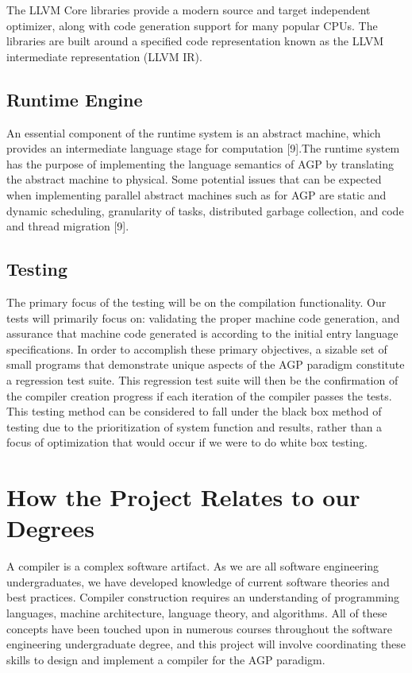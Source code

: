 \documentclass[11pt]{article}
\begin{document}
The LLVM Core libraries provide a modern source and target independent optimizer, along with code generation support for many popular CPUs. The libraries are built around a specified code representation known as the LLVM intermediate representation (LLVM IR).


\subsection{Runtime Engine}

An essential component of the runtime system is an abstract machine, which provides an intermediate language stage for computation [9].The runtime system has the purpose of implementing the language semantics of AGP by translating the abstract machine to physical. Some potential issues that can be expected when implementing parallel abstract machines such as for AGP are static and dynamic scheduling, granularity of tasks, distributed garbage collection, and code and thread migration [9].

\subsection{Testing}

The primary focus of the testing will be on the compilation functionality. Our tests will primarily focus on: validating the proper machine code generation, and assurance that machine code generated is according to the initial entry language specifications. In order to accomplish these primary objectives, a sizable set of small programs that demonstrate unique aspects of the AGP paradigm constitute a regression test suite. This regression test suite will then be the confirmation of the compiler creation progress if each iteration of the compiler passes the tests.
This testing method can be considered to fall under the black box method of testing due to the prioritization of system function and results, rather than a focus of optimization that would occur if we were to do white box testing.


\section{How the Project Relates to our Degrees}

A compiler is a complex software artifact. As we are all software engineering undergraduates, we have developed knowledge of current software theories and best practices. Compiler construction requires an understanding of programming languages, machine architecture, language theory, and algorithms. All of these concepts have been touched upon in numerous courses throughout the software engineering undergraduate degree, and this project will involve coordinating these skills to design and implement a compiler for the AGP paradigm. 
\end{document}
